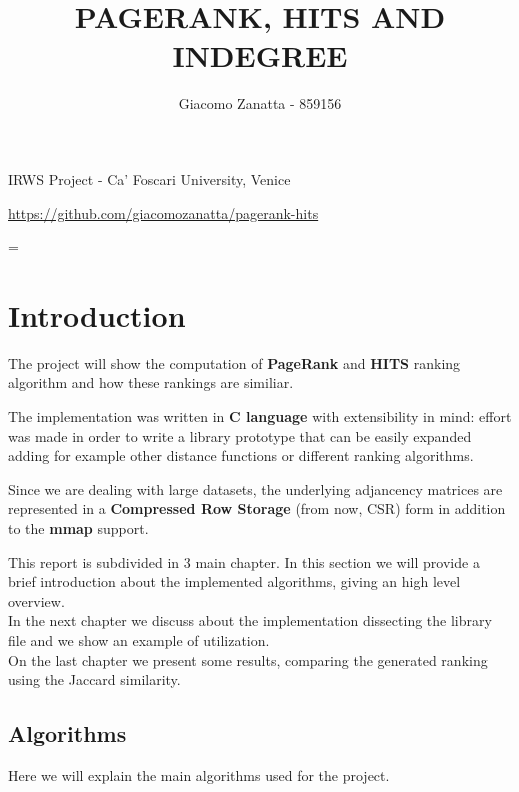 \documentclass[10pt]{article}
\title{\renewcommand{\baselinestretch}{1.17}\normalsize\bf%
\uppercase{PageRank, HITS and INDEGREE}
}
\author{
Giacomo Zanatta - 859156
}
\begin{document}
\date{}

\maketitle

\vspace{-0.5cm}

\begin{center}
{\footnotesize 
IRWS Project - Ca' Foscari University, Venice 
}
\end{center}

\bigskip
\noindent
{\small
\url{https://github.com/giacomozanatta/pagerank-hits}
}

\baselineskip=\normalbaselineskip

\section{Introduction}\label{sec:1}
The project \cite{Zanatta_Page_Rank_HITS_2022} will show the computation of {\bf PageRank}\cite{Page98thepagerank} and {\bf HITS}\cite{Kleinberg1999} ranking algorithm and how these rankings are similiar.

The implementation was written in {\bf C language} with extensibility in mind: effort was made in order to write a library prototype that can be easily expanded adding for example other distance functions or different ranking algorithms.

Since we are dealing with large datasets, the underlying adjancency matrices are represented in a {\bf Compressed Row Storage} (from now, CSR) form in addition to the {\bf mmap} support.

This report is subdivided in 3 main chapter.  
In this section we will provide a brief introduction about the implemented algorithms, giving an high level overview.\\
In the next chapter we discuss about the implementation dissecting the library file and we show an example of utilization.\\
On the last chapter we present some results, comparing the generated ranking using the Jaccard similarity.

\subsection{Algorithms}
Here we will explain the main algorithms used for the project.
\end{document}
